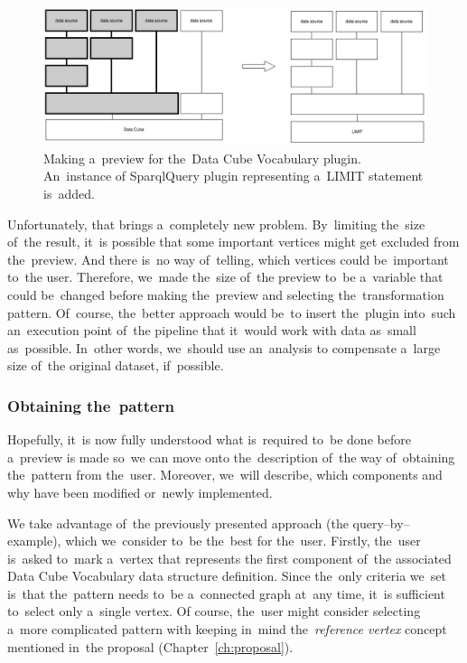 \begin{figure}
	\centering
	\includegraphics[width=140mm]{img/dcv-extraction-limit.png}
	\caption{Making a~preview for the~Data Cube Vocabulary plugin. An~instance of
	SparqlQuery plugin representing a~LIMIT statement is~added.}
	\label{fig:dcv-extraction-limit}
\end{figure}

Unfortunately, that brings a~completely new problem. By~limiting the~size of~the result, it~is possible that some important vertices might get excluded from the~preview.
And there is~no way of~telling, which vertices could be~important to~the user. Therefore, we~made the~size of~the preview to~be a~variable that could be~changed before making the~preview and 
selecting the~transformation pattern. Of~course, the~better approach would be~to 
insert the~plugin into~such an~execution point of~the pipeline that it~would 
work with data as~small as~possible. In~other words, we~should use an~analysis 
to compensate a~large size of~the original dataset, if~possible.



\subsubsection{Obtaining the~pattern}
Hopefully, it~is now fully understood what is~required to~be done before a~preview 
is made so~we can move onto the~description of~the way of~obtaining the~pattern 
from the~user. Moreover, we~will describe, which components and why have been 
modified or~newly implemented.

\begin{sloppypar}
We take advantage of~the previously presented approach (the query--by--example), which we~consider to~be the~best for the~user. Firstly, the~user is~asked to~mark a~vertex that represents
the first component of~the associated Data Cube Vocabulary data structure 
definition. Since the~only criteria we~set is~that the~pattern needs to~be a~connected graph at~any time, it~is sufficient to~select only a~single vertex.
Of course, the~user might consider selecting a~more complicated pattern with keeping in~mind the~\emph{reference vertex} concept mentioned in~the proposal (Chapter~\ref{ch:proposal}).
\end{sloppypar}

